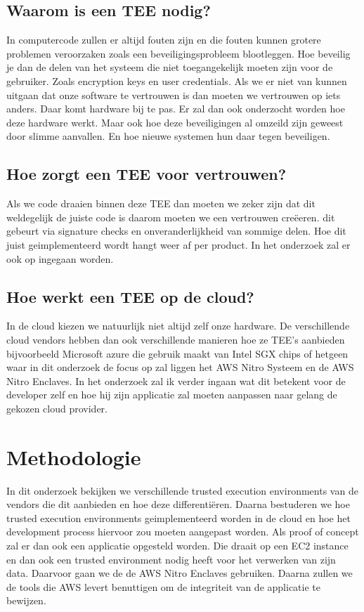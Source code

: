 \subsection{Waarom is een TEE nodig?}
In computercode zullen er altijd fouten zijn en die fouten kunnen grotere problemen veroorzaken zoals een beveiligingsprobleem blootleggen. Hoe beveilig je dan de delen van het systeem die niet toegangekelijk moeten zijn voor de gebruiker. Zoals encryption keys en user credentials. \autocite{Prado2020}
Als we er niet van kunnen uitgaan dat onze software te vertrouwen is dan moeten we vertrouwen op iets anders. Daar komt hardware bij te pas. Er zal dan ook onderzocht worden hoe deze hardware werkt. Maar ook hoe deze beveiligingen al omzeild zijn geweest door slimme aanvallen. En hoe nieuwe systemen hun daar tegen beveiligen.

\subsection{Hoe zorgt een TEE voor vertrouwen?}
Als we code draaien binnen deze TEE dan moeten we zeker zijn dat dit weldegelijk de juiste code is daarom moeten we een vertrouwen creëeren. dit gebeurt via signature checks en onveranderlijkheid van sommige delen. Hoe dit juist geimplementeerd wordt hangt weer af per product. In het onderzoek zal er ook op ingegaan worden.

\subsection{Hoe werkt een TEE op de cloud?}
In de cloud kiezen we natuurlijk niet altijd zelf onze hardware. De verschillende cloud vendors hebben dan ook verschillende manieren hoe ze TEE's aanbieden bijvoorbeeld Microsoft azure die gebruik maakt van Intel SGX chips  of hetgeen waar in dit onderzoek de focus op zal liggen het AWS Nitro Systeem en de AWS Nitro Enclaves. In het onderzoek zal ik verder ingaan wat dit betekent voor de developer zelf en hoe hij zijn applicatie zal moeten aanpassen naar gelang de gekozen cloud provider.

\section{Methodologie}
\label{sec:methodologie}
In dit onderzoek bekijken we verschillende trusted execution environments van de vendors die dit aanbieden en hoe deze differentiëren. Daarna bestuderen we hoe trusted execution environments geimplementeerd worden in de cloud en hoe het development process hiervoor zou moeten aangepast worden. Als proof of concept zal er dan ook een applicatie opgesteld worden. Die draait op een EC2 instance en dan ook een trusted environment nodig heeft voor het verwerken van zijn data. Daarvoor gaan we de de AWS Nitro Enclaves gebruiken. Daarna zullen we de tools die AWS levert benuttigen om de integriteit van de applicatie te bewijzen.


